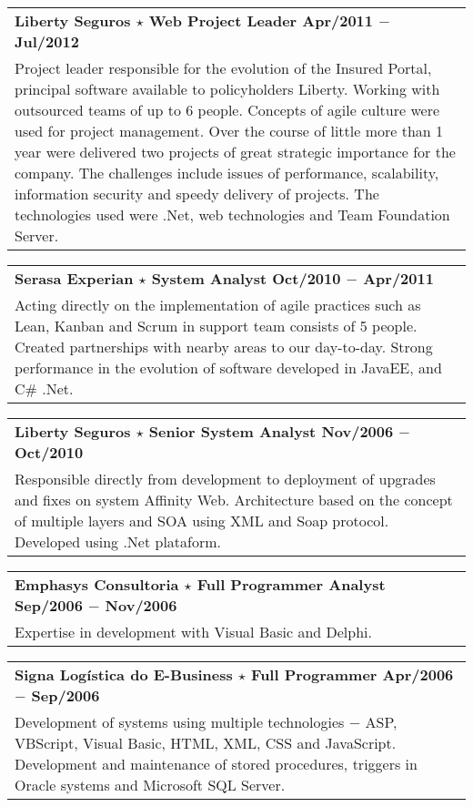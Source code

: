 \documentclass[a4paper, oneside, final]{scrartcl}
\newcommand{\vspc}{\vspace{0.15cm}} %
\begin{document}
\begin{center}
\begin{tabularx}{1\linewidth}{X}
{\bf Liberty Seguros $\star$ Web Project Leader \hfill Apr/2011 $-$ Jul/2012} \\
Project leader responsible for the evolution of the Insured Portal, principal software available to policyholders Liberty. Working with outsourced teams of up to 6 people. Concepts of agile culture were used for project management. Over the course of little more than 1 year were delivered two projects of great strategic importance for the company. The challenges include issues of performance, scalability, information security and speedy delivery of projects. The technologies used were .Net, web technologies and Team Foundation Server. \vspc\\
\end{tabularx}

\begin{tabularx}{1\linewidth}{X}
{\bf Serasa Experian $\star$  System Analyst \hfill Oct/2010 $-$ Apr/2011} \\
Acting directly on the implementation of agile practices such as Lean, Kanban and Scrum in support team consists of 5 people. Created partnerships with nearby areas to our day-to-day. Strong performance in the evolution of software developed in JavaEE, and C\# .Net. \vspc\\
\end{tabularx}

\begin{tabularx}{1\linewidth}{X}
{\bf Liberty Seguros $\star$ Senior System Analyst \hfill Nov/2006 $-$ Oct/2010} \\
Responsible directly from development to deployment of upgrades and fixes on system Affinity Web. Architecture based on the concept of multiple layers and SOA using XML and Soap protocol. Developed using .Net plataform.\vspc\\
\end{tabularx}

\begin{tabularx}{1\linewidth}{X}
{\bf Emphasys Consultoria $\star$ Full Programmer Analyst \hfill Sep/2006 $-$ Nov/2006} \\
Expertise in development with Visual Basic and Delphi. \vspc\\
\end{tabularx}

\begin{tabularx}{1\linewidth}{X}
{\bf Signa Logística do E-Business $\star$ Full Programmer \hfill Apr/2006 $-$ Sep/2006} \\
Development of systems using multiple technologies $-$ ASP, VBScript, Visual Basic, HTML, XML, CSS and JavaScript. Development and maintenance of stored procedures, triggers in Oracle systems and Microsoft SQL Server. \vspc\\
\end{tabularx}


\end{center}
\end{document}
